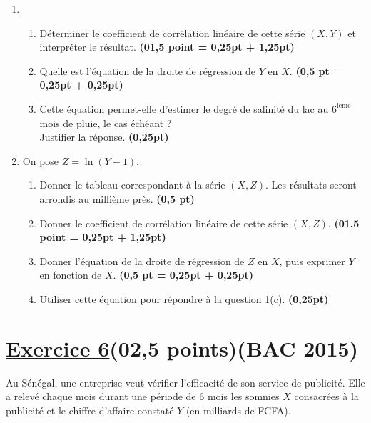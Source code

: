 \documentclass[12pt,a4paper]{article}
\begin{document}
\begin{enumerate}
    \item 
    \begin{enumerate}
        \item Déterminer le coefficient de corrélation linéaire de cette série \((X, Y)\) et interpréter le résultat.
        \hfill \textbf{(01,5 point = 0,25pt + 1,25pt)}

        \item Quelle est l’équation de la droite de régression de \( Y \) en \( X \). 
        \hfill \textbf{(0,5 pt = 0,25pt + 0,25pt)}

        \item Cette équation permet-elle d’estimer le degré de salinité du lac au \(6^\text{ième}\) mois de pluie, le cas échéant ?\\
        Justifier la réponse.
        \hfill \textbf{(0,25pt)}
    \end{enumerate}

    \item On pose \( Z = \ln(Y - 1) \).
    \begin{enumerate}
        \item Donner le tableau correspondant à la série \((X, Z)\). Les résultats seront arrondis au millième près.
        \hfill \textbf{(0,5 pt)}

        \item Donner le coefficient de corrélation linéaire de cette série \((X, Z)\).
        \hfill \textbf{(01,5 point = 0,25pt + 1,25pt)}

        \item Donner l’équation de la droite de régression de \( Z \) en \( X \), puis exprimer \( Y \) en fonction de \( X \).
        \hfill \textbf{(0,5 pt = 0,25pt + 0,25pt)}

        \item Utiliser cette équation pour répondre à la question 1(c).
        \hfill \textbf{(0,25pt)}
    \end{enumerate}
\end{enumerate}

\section*{\underline{Exercice 6}(02,5 points)(BAC 2015)}
\vspace{0.3cm}

Au Sénégal, une entreprise veut vérifier l’efficacité de son service de publicité. Elle a relevé chaque mois durant une période de 6 mois les sommes \( X \) consacrées à la publicité et le chiffre d’affaire constaté \( Y \) (en milliards de FCFA).\\
\end{document}
